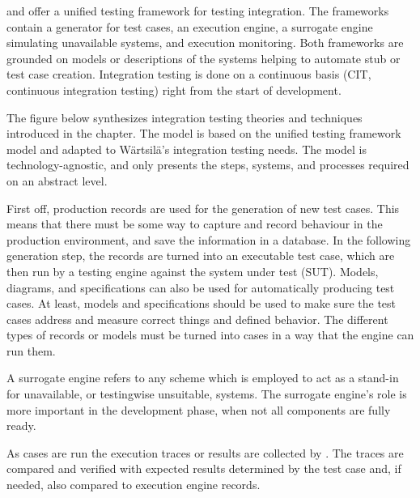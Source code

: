 \documentclass[12pt,a4paper,oneside,pdftex]{report}
\begin{document}
{\citet{huang2008surrogate} and \citet{liu2009unified} offer a unified testing framework for testing integration. The frameworks contain a generator for test cases, an execution engine, a surrogate engine simulating unavailable systems, and execution monitoring. Both frameworks are grounded on models or descriptions of the systems helping to automate stub or test case creation. Integration testing is done on a continuous basis (CIT, continuous integration testing) right from the start of development.

The figure below synthesizes integration testing theories and techniques introduced in the chapter. The model is based on the \citet{liu2009unified} unified testing framework model and adapted to Wärtsilä's integration testing needs. The model is technology-agnostic, and only presents the steps, systems, and processes required on an abstract level.

First off, production records are used for the generation of new test cases. This means that there must be some way to capture and record behaviour in the production environment, and save the information in a database. In the following generation step, the records are turned into an executable test case, which are then run by a testing engine against the system under test (SUT). Models, diagrams, and specifications can also be used for automatically producing test cases. At least, models and specifications should be used to make sure the test cases address and measure correct things and defined behavior. The different types of records or models must be turned into cases in a way that the engine can run them. 

A surrogate engine refers to any scheme which is employed to act as a stand-in for unavailable, or testingwise unsuitable, systems. The surrogate engine's role is more important in the development phase, when not all components are fully ready.

As cases are run the execution traces or results are collected by . The traces are compared and verified with expected results determined by the test case and, if needed, also compared to execution engine records. 

%


}
\end{document}
